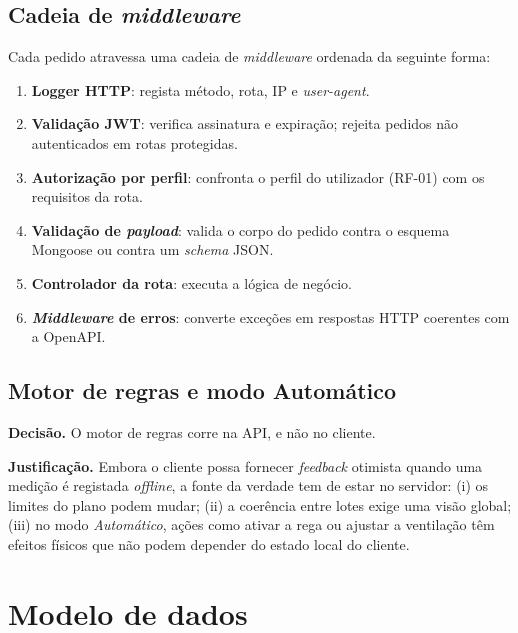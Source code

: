 \subsection{Cadeia de \emph{middleware}}

Cada pedido atravessa uma cadeia de \emph{middleware} ordenada da
seguinte forma:

\begin{enumerate}
  \item \textbf{Logger HTTP}: regista método, rota, IP e \emph{user-agent}.
  \item \textbf{Validação JWT}: verifica assinatura e expiração; rejeita pedidos não autenticados em rotas protegidas.
  \item \textbf{Autorização por perfil}: confronta o perfil do utilizador (RF-01) com os requisitos da rota.
  \item \textbf{Validação de \emph{payload}}: valida o corpo do pedido contra o esquema Mongoose ou contra um \emph{schema} JSON.
  \item \textbf{Controlador da rota}: executa a lógica de negócio.
  \item \textbf{\emph{Middleware} de erros}: converte exceções em respostas HTTP coerentes com a OpenAPI.
\end{enumerate}


\subsection{Motor de regras e modo Automático}
\label{sec:motor-regras}

\begin{decisao}[title=Decisão DA-02: localização do motor de regras]
\textbf{Decisão.} O motor de regras corre na API, e não no cliente.

\textbf{Justificação.} Embora o cliente possa fornecer \emph{feedback}
otimista quando uma medição é registada \emph{offline}, a fonte da
verdade tem de estar no servidor: (i) os limites do plano podem
mudar; (ii) a coerência entre lotes exige uma visão global; (iii)
no modo \emph{Automático}, ações como ativar a rega ou ajustar a
ventilação têm efeitos físicos que não podem depender do estado
local do cliente.
\end{decisao}


\section{Modelo de dados}
\label{sec:modelo-dados}

